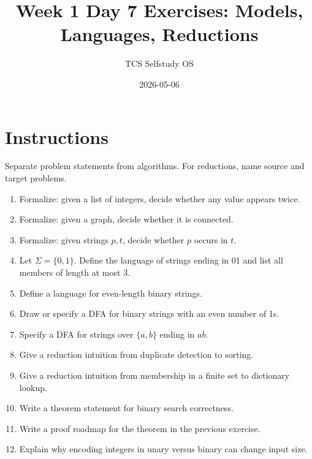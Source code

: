 \documentclass[11pt]{article}
\title{Week 1 Day 7 Exercises: Models, Languages, Reductions}
\author{TCS Selfstudy OS}
\date{2026-05-06}
\begin{document}
\maketitle

\section*{Instructions}
Separate problem statements from algorithms. For reductions, name source and target problems.

\begin{enumerate}[label=\textbf{D7.\arabic*.}]
\item Formalize: given a list of integers, decide whether any value appears twice.
\item Formalize: given a graph, decide whether it is connected.
\item Formalize: given strings $p,t$, decide whether $p$ occurs in $t$.
\item Let $\Sigma=\{0,1\}$. Define the language of strings ending in 01 and list all members of length at most 3.
\item Define a language for even-length binary strings.
\item Draw or specify a DFA for binary strings with an even number of 1s.
\item Specify a DFA for strings over $\{a,b\}$ ending in $ab$.
\item Give a reduction intuition from duplicate detection to sorting.
\item Give a reduction intuition from membership in a finite set to dictionary lookup.
\item Write a theorem statement for binary search correctness.
\item Write a proof roadmap for the theorem in the previous exercise.
\item Explain why encoding integers in unary versus binary can change input size.
\end{enumerate}
\end{document}
